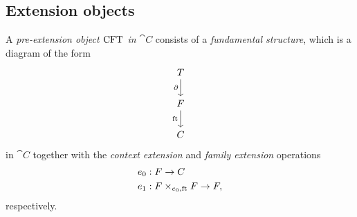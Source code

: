 \subsection{Extension objects}
\begin{defn}
A \emph{pre-extension object $\mathrm{CFT}$ in $\cat{C}$} consists of a \emph{fundamental structure}, which is a diagram of the form
\begin{equation*}
\begin{tikzcd}
\stesyst
  \ar{d}[swap]{\ebd}
  \\
\stesysf
  \ar{d}[swap]{\eft}
  \\
\stesysc
\end{tikzcd}
\end{equation*}
in $\cat{C}$ together with the \emph{context extension} and \emph{family extension} operations
\begin{align*}
\ectxext &:\stesysf\to \stesysc\\
\efamext & :\stesysff\to \stesysf,
\end{align*}
respectively.
\end{defn}

